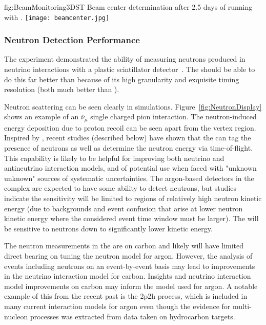 \begin{dunefigure}{fig:BeamMonitoring3DST}
{Beam center determination after 2.5 days of running with .}
\texttt{[image: beamcenter.jpg]}
\end{dunefigure}

\subsubsection{Neutron Detection Performance}

The  experiment demonstrated the ability of measuring neutrons produced in neutrino interactions with a plastic scintillator detector~\cite{Elkins:2019vmy}. 
The  should be able to do this far better than  because of its high granularity and exquisite timing resolution (both much better than ). 

Neutron scattering can  be seen clearly in  simulations. 
Figure~\ref{fig:NeutronDisplay} shows an example of an
$\overline{\nu}_{\mu}$   single charged pion interaction. The neutron-induced energy deposition due to proton recoil can be seen apart from the vertex region. 
Inspired by , recent studies (described below) have shown that the  can tag the presence of neutrons as well as determine the neutron energy via time-of-flight. 
This capability is likely to be helpful for 
 improving both neutrino and antineutrino interaction models, and of potential use when faced with "unknown unknown" sources of systematic uncertainties. The argon-based detectors in the  complex are expected to have some ability to detect neutrons, but studies indicate the sensitivity will be limited to regions of relatively high neutron kinetic energy (due to backgrounds and event confusion that arise at lower neutron kinetic energy where the considered event time window must be larger).  The  will be sensitive to neutrons down to significantly lower kinetic energy. 

The neutron measurements in the  are on carbon and likely will have limited direct bearing on tuning the neutron model for argon.  However, the analysis of events including neutrons on an event-by-event basis may lead to improvements in the neutrino interaction model for carbon.  Insights and neutrino interaction model improvements on carbon may inform the model used for argon.  A notable example of this from the recent past is the 2p2h process, which is included in many current interaction models for argon even though the evidence for multi-nucleon processes was 
 extracted from data taken on hydrocarbon targets.


